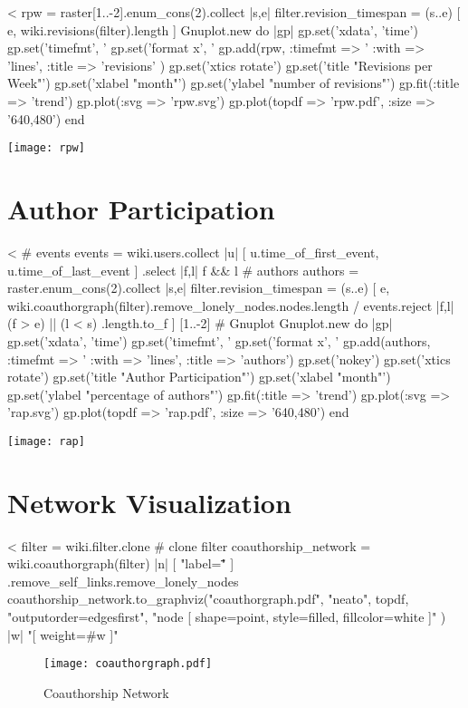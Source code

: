 \documentclass{scrartcl}
\begin{document}
<%
rpw = raster[1..-2].enum_cons(2).collect { |s,e| 
	filter.revision_timespan = (s..e)
	[ e, wiki.revisions(filter).length ]
	}
Gnuplot.new do |gp|
	gp.set('xdata', 'time')
	gp.set('timefmt', '%
	gp.set('format x', '%
	gp.add(rpw, :timefmt => '%
		:with => 'lines', 
		:title => 'revisions' )
	gp.set('xtics rotate')
	gp.set('title "Revisions per Week"')
	gp.set('xlabel "month"')
	gp.set('ylabel "number of revisions"')
	gp.fit(:title => 'trend')
	gp.plot(:svg => 'rpw.svg')
	gp.plot(topdf => 'rpw.pdf', :size => '640,480')
end
\begin{center}
  \texttt{[image: rpw]}
\end{center}


\section{Author Participation} %
\label{sec:author_participation}

<%
# events
events = wiki.users.collect{ |u| 
	[ u.time_of_first_event, u.time_of_last_event ] 
    }.select { |f,l| f && l }
# authors
authors = raster.enum_cons(2).collect { |s,e|
	filter.revision_timespan = (s..e)
	[ e,
    	wiki.coauthorgraph(filter).remove_lonely_nodes.nodes.length /
        events.reject { |f,l| (f > e) || (l < s) }.length.to_f ]
	}[1..-2]
# Gnuplot
Gnuplot.new do |gp|
	gp.set('xdata', 'time')
	gp.set('timefmt', '%
	gp.set('format x', '%
	gp.add(authors, :timefmt => '%
		:with => 'lines',
		:title => 'authors')
	gp.set('nokey')
	gp.set('xtics rotate')
	gp.set('title "Author Participation"')
	gp.set('xlabel "month"')
	gp.set('ylabel "percentage of authors"')
	gp.fit(:title => 'trend')
	gp.plot(:svg => 'rap.svg')
	gp.plot(topdf => 'rap.pdf', :size => '640,480')
end
\begin{center}
  \texttt{[image: rap]}
\end{center}


\section{Network Visualization} %
\label{sec:network_visualization}

<%
filter = wiki.filter.clone # clone filter
coauthorship_network = wiki.coauthorgraph(filter) { |n| [ "label=\"\"" ] }.remove_self_links.remove_lonely_nodes
coauthorship_network.to_graphviz("coauthorgraph.pdf", "neato", topdf, "outputorder=edgesfirst", "node [ shape=point, style=filled, fillcolor=white ]" ) { |w|  "[ weight=#{w} ]" }
\begin{figure}[htbp]
	\centering
	\texttt{[image: coauthorgraph.pdf]}
	\caption{Coauthorship Network}
	\label{fig:coauthorship_network}
\end{figure}
\end{document}
